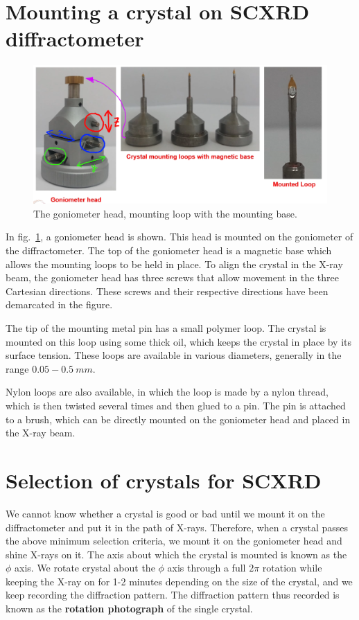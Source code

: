 \documentclass[11pt,a4paper]{article}
\newcommand{\bfnt}[1]{{\bfseries #1}}
\begin{document}
	
	
	\section{Mounting a crystal on SCXRD diffractometer}
	
		\begin{figure}[t]
			\includegraphics[scale=0.5]{goniometer_mod.png}
			\caption{\label{fig:goniometer}The goniometer head, mounting loop with the mounting base.}
		\end{figure}
	
		In fig.~\ref{fig:goniometer}, a goniometer head is shown. This head is mounted on the goniometer of the diffractometer. The top of the goniometer head is a magnetic base which allows the mounting loops to be held in place. To align the crystal in the X-ray beam, the goniometer head has three screws that allow movement in the three Cartesian directions. These screws and their respective directions have been demarcated in the figure.

		The tip of the mounting metal pin has a small polymer loop. The crystal is mounted on this loop using some thick oil, which keeps the crystal in place by its surface tension. These loops are available in various diameters, generally in the range $0.05-0.5~\si{mm}.$

		Nylon loops are also available, in which the loop is made by a nylon thread, which is then twisted several times and then glued to a pin. The pin is attached to a brush, which can be directly mounted on the goniometer head and placed in the X-ray beam.
		
	\section{Selection of crystals for SCXRD}
	
		
	
		We cannot know whether a crystal is good or bad until we mount it on the diffractometer and put it in the path of X-rays. Therefore, when a crystal passes the above minimum selection criteria, we mount it on the goniometer head and shine X-rays on it. The axis about which the crystal is mounted is known as the $\phi$ axis. We rotate crystal about the $\phi$ axis through a full $2\pi$ rotation while keeping the X-ray on for 1-2 minutes depending on the size of the crystal, and we keep recording the diffraction pattern. The diffraction pattern thus recorded is known as the \bfnt{rotation photograph} of the single crystal.
		
\end{document}
